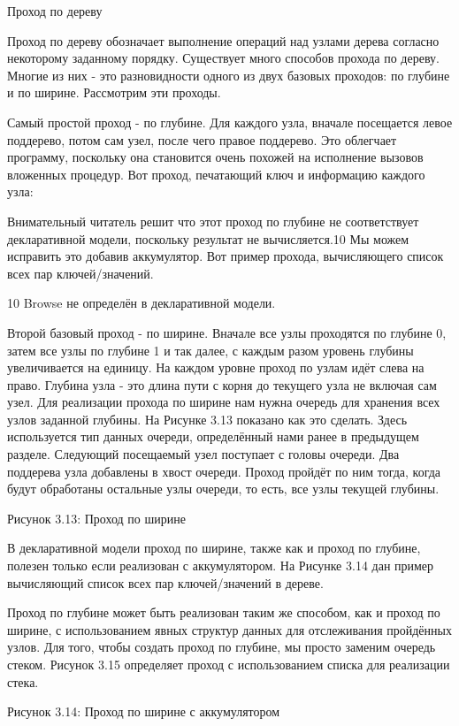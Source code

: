 Проход по дереву

Проход по дереву обозначает выполнение операций над узлами дерева согласно некоторому заданному порядку. Существует много способов прохода по дереву. Многие из них - это разновидности одного из двух базовых проходов: по глубине и по ширине. Рассмотрим эти проходы.

Самый простой проход - по глубине. Для каждого узла, вначале посещается левое поддерево, потом сам узел, после чего правое поддерево. Это облегчает программу, поскольку она становится очень похожей на исполнение вызовов вложенных процедур. Вот проход, печатающий ключ и информацию каждого узла:

Внимательный читатель решит что этот проход по глубине не соответствует декларативной модели, поскольку результат не вычисляется.10 Мы можем исправить это добавив аккумулятор. Вот пример прохода, вычисляющего список всех пар ключей/значений.

10 Browse не определён в декларативной модели.

Второй базовый проход - по ширине. Вначале все узлы проходятся по глубине 0, затем все узлы по глубине 1 и так далее, с каждым разом уровень глубины увеличивается на единицу. На каждом уровне проход по узлам идёт слева на право. Глубина узла - это длина пути с корня до текущего узла не включая сам узел. Для реализации прохода по ширине нам нужна очередь для хранения всех узлов заданной глубины. На Рисунке 3.13 показано как это сделать. Здесь используется тип данных очереди, определённый нами ранее в предыдущем разделе. Следующий посещаемый узел поступает с головы очереди. Два поддерева узла добавлены в хвост очереди. Проход пройдёт по ним тогда, когда будут обработаны остальные узлы очереди, то есть, все узлы текущей глубины.

Рисунок 3.13: Проход по ширине

В декларативной модели проход по ширине, также как и проход по глубине, полезен только если реализован с аккумулятором. На Рисунке 3.14 дан пример вычисляющий список всех пар ключей/значений в дереве.

Проход по глубине может быть реализован таким же способом, как и проход по ширине, с использованием явных структур данных для отслеживания пройдённых узлов. Для того, чтобы создать проход по глубине, мы просто заменим очередь стеком. Рисунок 3.15 определяет проход с использованием списка для реализации стека.

Рисунок 3.14: Проход по ширине с аккумулятором

